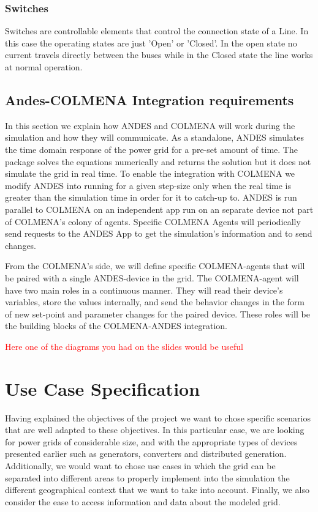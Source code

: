 \documentclass{article}
\begin{document}
\subsubsection*{Switches}
Switches are controllable elements that control the connection state of a Line. In this case the operating states are just 'Open' or 'Closed'. In the open state no current travels directly between the buses while in the Closed state the line works at normal operation. \\

\subsection{Andes-COLMENA Integration requirements}

In this section we explain how ANDES and COLMENA will work during the simulation and how they will communicate. As a standalone, ANDES simulates the time domain response of the power grid for a pre-set amount of time. The package solves the equations numerically and returns the solution but it does not simulate the grid in real time. To enable the integration with COLMENA we modify ANDES into running for a given step-size only when the real time is greater than the simulation time in order for it to catch-up to. ANDES is run parallel to COLMENA on an independent app run on an separate device not part of COLMENA's colony of agents. Specific COLMENA Agents will periodically send requests to the ANDES App to get the simulation's information and to send changes.   

From the COLMENA's side, we will define specific COLMENA-agents that will be paired with a single ANDES-device in the grid. The COLMENA-agent will have two main roles in a continuous manner. They will read their device's variables, store the values internally, and send the behavior changes in the form of new set-point and parameter changes for the paired device. These roles will be the building blocks of the COLMENA-ANDES integration.      

\textcolor{red}{Here one of the diagrams you had on the slides would be useful}

\section{Use Case Specification}

Having explained the objectives of the project we want to chose specific scenarios that are well adapted to these objectives. In this particular case, we are looking for power grids of considerable size, and with the appropriate types of devices presented earlier such as generators, converters and distributed generation. Additionally, we would want to chose use cases in which the grid can be separated into different areas to properly implement into the simulation the different geographical context that we want to take into account. Finally, we also consider the ease to access information and data about the modeled grid.  
\end{document}
